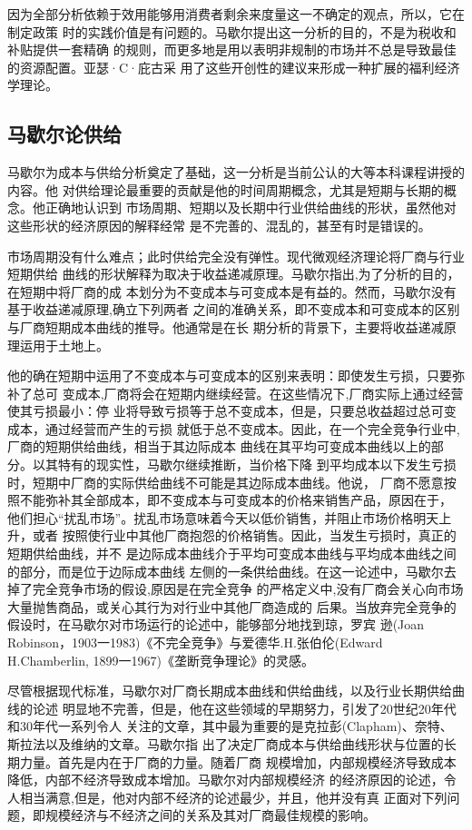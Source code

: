 因为全部分析依赖于效用能够用消费者剩余来度量这一不确定的观点，所以，它在制定政策
时的实践价值是有问题的。马歇尔提出这一分析的目的，不是为税收和补贴提供一套精确
的规则，而更多地是用以表明非规制的市场并不总是导致最佳的资源配置。亚瑟·C·庇古采
用了这些开创性的建议来形成一种扩展的福利经济学理论。

\subsection{马歇尔论供给}

马歇尔为成本与供给分析奠定了基础，这一分析是当前公认的大等本科课程讲授的内容。他
对供给理论最重要的贡献是他的时间周期概念，尤其是短期与长期的概念。他正确地认识到
市场周期、短期以及长期中行业供给曲线的形状，虽然他对这些形状的经济原因的解释经常
是不完善的、混乱的，甚至有时是错误的。

市场周期没有什么难点；此时供给完全没有弹性。现代微观经济理论将厂商与行业短期供给
曲线的形状解释为取决于收益递减原理。马歇尔指出,为了分析的目的，在短期中将厂商的成
本划分为不变成本与可变成本是有益的。然而，马歇尔没有基于收益递减原理,确立下列两者
之间的准确关系，即不变成本和可变成本的区别与厂商短期成本曲线的推导。他通常是在长
期分析的背景下，主要将收益递减原理运用于土地上。

他的确在短期中运用了不变成本与可变成本的区别来表明：即使发生亏损，只要弥补了总可
变成本,厂商将会在短期内继续经营。在这些情况下,厂商实际上通过经营使其亏损最小：停
业将导致亏损等于总不变成本，但是，只要总收益超过总可变成本，通过经营而产生的亏损
就低于总不变成本。因此，在一个完全竞争行业中,厂商的短期供给曲线，相当于其边际成本
曲线在其平均可变成本曲线以上的部分。以其特有的现实性，马歇尔继续推断，当价格下降
到平均成本以下发生亏损时，短期中厂商的实际供给曲线不可能是其边际成本曲线。他说，
厂商不愿意按照不能弥补其全部成本，即不变成本与可变成本的价格来销售产品，原因在于，
他们担心“扰乱市场”。扰乱市场意味着今天以低价销售，并阻止市场价格明天上升，或者
按照使行业中其他厂商抱怨的价格销售。因此，当发生亏损时，真正的短期供给曲线，并不
是边际成本曲线介于平均可变成本曲线与平均成本曲线之间的部分，而是位于边际成本曲线
左侧的一条供给曲线。在这一论述中，马歇尔去掉了完全竞争市场的假设,原因是在完全竞争
的严格定义中,没有厂商会关心向市场大量抛售商品，或关心其行为对行业中其他厂商造成的
后果。当放弃完全竞争的假设时，在马歇尔对市场运行的论述中，能够部分地找到琼，罗宾
逊(Joan Robinson，1903一1983)《不完全竞争》与爱德华.H.张伯伦(Edward
H.Chamberlin, 1899一1967)《垄断竞争理论》的灵感。

尽管根据现代标准，马歇尔对厂商长期成本曲线和供给曲线，以及行业长期供给曲线的论述
明显地不完善，但是，他在这些领域的早期努力，引发了20世纪20年代和30年代一系列令人
关注的文章，其中最为重要的是克拉彭(Clapham)、奈特、斯拉法以及维纳的文章。马歇尔指
出了决定厂商成本与供给曲线形状与位置的长期力量。首先是内在于厂商的力量。随着厂商
规模增加，内部规模经济导致成本降低，内部不经济导致成本增加。马歇尔对内部规模经济
的经济原因的论述，令人相当满意,但是，他对内部不经济的论述最少，并且，他并没有真
正面对下列问题，即规模经济与不经济之间的关系及其对厂商最佳规模的影响。

